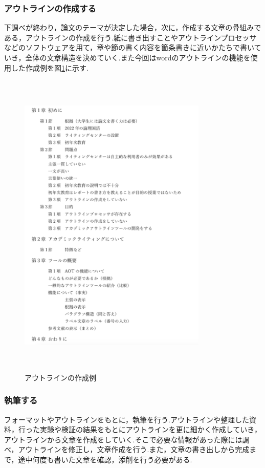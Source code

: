 \documentclass[a4j,12pt]{jarticle}
\begin{document}
\subsubsection{アウトラインの作成する}
下調べが終わり，論文のテーマが決定した場合，次に，作成する文章の骨組みである，アウトラインの作成を行う.紙に書き出すことやアウトラインプロセッサなどのソフトウェアを用て，章や節の書く内容を箇条書きに近いかたちで書いていき，全体の文章構造を決めていく.また今回はwordのアウトラインの機能を使用した作成例を図\ref{fig:a}に示す.
\begin{figure}[h]
\begin{center}
 \includegraphics[clip,width=90mm,height=150mm]{figure/outline2.png}
\end{center}
 \caption{アウトラインの作成例}
 \label{fig:a}
\end{figure}
\newpage
\subsubsection{執筆する}
フォーマットやアウトラインをもとに，執筆を行う.アウトラインや整理した資料，行った実験や検証の結果をもとにアウトラインを更に細かく作成していき，アウトラインから文章を作成をしていく.そこで必要な情報があった際には調べ，アウトラインを修正し，文章作成を行う.また，文章の書き出しから完成まで，途中何度も書いた文章を確認，添削を行う必要がある.
\newpage
\end{document}
